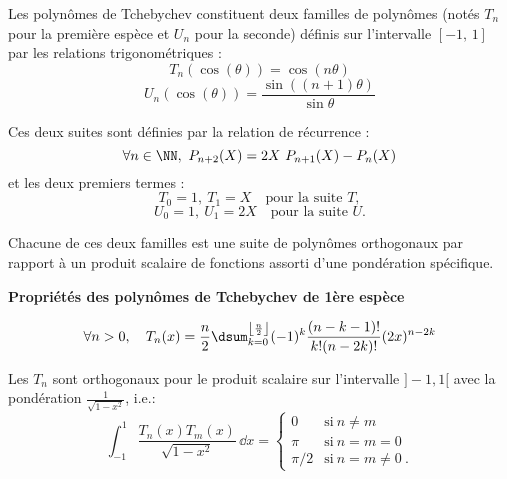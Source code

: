 \medskip
Les polynômes de Tchebychev 
constituent deux familles de polynômes (notés $T_n$ 
pour la première espèce et $U_n$ pour la seconde) définis sur l'intervalle $[-1,\, 1]$ par 
les relations trigonométriques :
\begin{equation}
    T_n(\cos(\theta))=\cos(n\theta)
\end{equation}
\begin{equation}
    U_n(\cos(\theta))=\frac{\sin((n+1) \theta)}{\sin \theta}
\end{equation}

Ces deux suites sont définies par la relation de récurrence :
\begin{equation}
    \forall n\in\NN,~P_{n+2}(X)=2X~P_{n+1}(X)-P_n(X)
\end{equation}
et les deux premiers termes :
\begin{equation}
    T_0=1,~T_1=X \quad \text{pour la suite } T,
\end{equation}
\begin{equation}
    U_0=1,~U_1=2X \quad \text{pour la suite } U.
\end{equation}

Chacune de ces deux familles est une suite de polynômes orthogonaux 
par rapport à un produit scalaire de fonctions assorti d'une pondération spécifique.

\medskip
\textbf{Propriétés des polynômes de Tchebychev de 1ère espèce}

\begin{equation}
\forall n>0, \quad
    T_n(x)=\dfrac n2\dsum_{k=0}^{\left\lfloor \frac n2\right\rfloor}(-1)^k \frac{(n-k-1)!}{k!(n-2k)!}(2x)^{n-2k}
\end{equation}

Les $T_n$ sont orthogonaux pour le produit scalaire sur l'intervalle $]-1,1[$ avec la 
pondération $\frac1{\sqrt{1-x^2}}$, i.e.:
\begin{equation}
    \int_{-1}^1 \frac{T_n(x)T_m(x)}{\sqrt{1-x^2}}\,\dd x= \begin{cases} 0&\text{si}~n\ne m\\ \pi&\text{si}~n=m=0\\ \pi/2&\text{si}~n=m\ne 0~. \end{cases} 
\end{equation}

